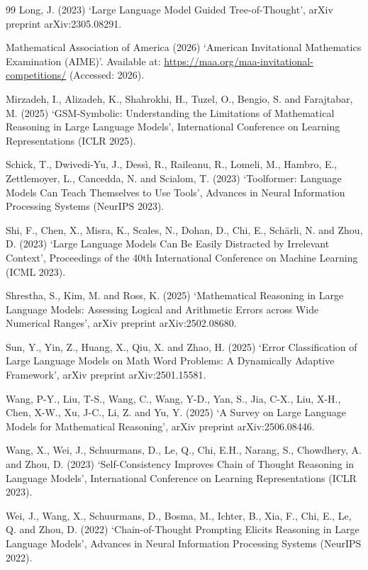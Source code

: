 \documentclass[a4paper,11pt,twoside]{report}
\begin{document}
\begin{thebibliography}{99}
Long, J. (2023) `Large Language Model Guided Tree-of-Thought', arXiv
preprint arXiv:2305.08291.

Mathematical Association of America (2026) `American Invitational
Mathematics Examination (AIME)'. Available at:
\url{https://maa.org/maa-invitational-competitions/} (Accessed: 2026).

Mirzadeh, I., Alizadeh, K., Shahrokhi, H., Tuzel, O., Bengio, S. and
Farajtabar, M. (2025) `GSM-Symbolic: Understanding the Limitations of
Mathematical Reasoning in Large Language Models', International
Conference on Learning Representations (ICLR 2025).

Schick, T., Dwivedi-Yu, J., Dess\`i, R., Raileanu, R., Lomeli, M.,
Hambro, E., Zettlemoyer, L., Cancedda, N. and Scialom, T. (2023)
`Toolformer: Language Models Can Teach Themselves to Use Tools',
Advances in Neural Information Processing Systems (NeurIPS 2023).

Shi, F., Chen, X., Misra, K., Scales, N., Dohan, D., Chi, E., Sch\"arli,
N. and Zhou, D. (2023) `Large Language Models Can Be Easily Distracted
by Irrelevant Context', Proceedings of the 40th International
Conference on Machine Learning (ICML 2023).

Shrestha, S., Kim, M. and Ross, K. (2025) `Mathematical Reasoning in
Large Language Models: Assessing Logical and Arithmetic Errors across
Wide Numerical Ranges', arXiv preprint arXiv:2502.08680.

Sun, Y., Yin, Z., Huang, X., Qiu, X. and Zhao, H. (2025) `Error
Classification of Large Language Models on Math Word Problems: A
Dynamically Adaptive Framework', arXiv preprint arXiv:2501.15581.

Wang, P-Y., Liu, T-S., Wang, C., Wang, Y-D., Yan, S., Jia, C-X., Liu,
X-H., Chen, X-W., Xu, J-C., Li, Z. and Yu, Y. (2025) `A Survey on Large
Language Models for Mathematical Reasoning', arXiv preprint
arXiv:2506.08446.

Wang, X., Wei, J., Schuurmans, D., Le, Q., Chi, E.H., Narang, S.,
Chowdhery, A. and Zhou, D. (2023) `Self-Consistency Improves Chain of
Thought Reasoning in Language Models', International Conference on
Learning Representations (ICLR 2023).

Wei, J., Wang, X., Schuurmans, D., Bosma, M., Ichter, B., Xia, F., Chi,
E., Le, Q. and Zhou, D. (2022) `Chain-of-Thought Prompting Elicits
Reasoning in Large Language Models', Advances in Neural Information
Processing Systems (NeurIPS 2022).


\end{thebibliography}
\end{document}
